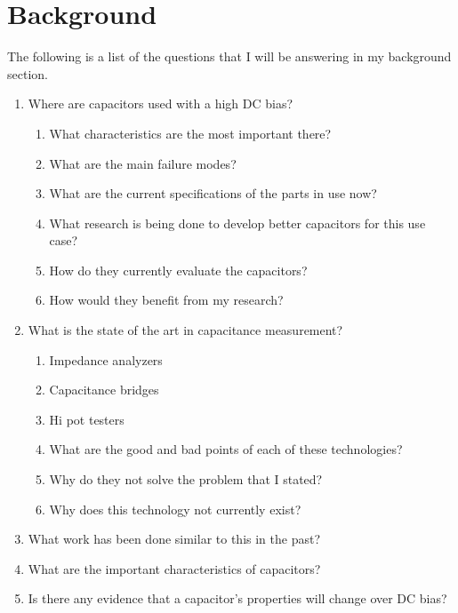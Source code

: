 \section {Background}

The following is a list of the questions that I will be answering in my background section.

\begin {enumerate}
    \item Where are capacitors used with a high DC bias?
    \begin {enumerate}
        \item What characteristics are the most important there?
        \item What are the main failure modes?
        \item What are the current specifications of the parts in use now?
        \item What research is being done to develop better capacitors for this use case?
        \item How do they currently evaluate the capacitors?
        \item How would they benefit from my research?
    \end {enumerate}
    \item What is the state of the art in capacitance measurement?
    \begin {enumerate}
        \item Impedance analyzers
        \item Capacitance bridges
        \item Hi pot testers
        \item What are the good and bad points of each of these technologies?
        \item Why do they not solve the problem that I stated? 
        \item Why does this technology not currently exist?
    \end {enumerate}
    \item What work has been done similar to this in the past?
    \item What are the important characteristics of capacitors?
    \item Is there any evidence that a capacitor's properties will change over DC bias?
\end {enumerate}

